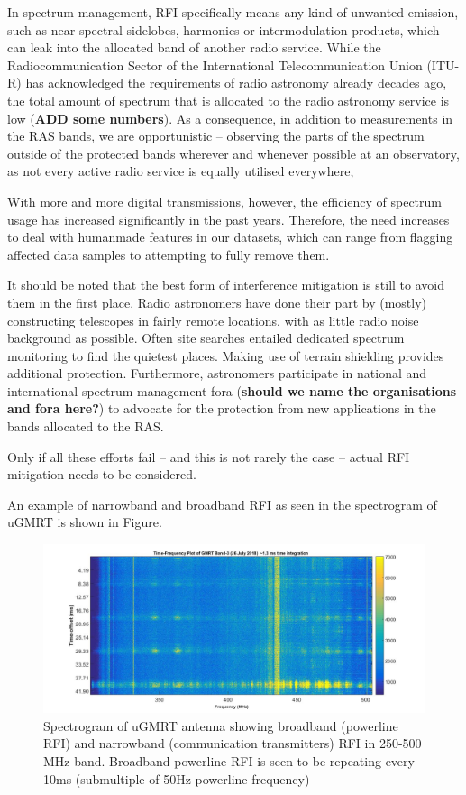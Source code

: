 In spectrum management, RFI specifically means any kind of unwanted emission, such as near spectral sidelobes, harmonics or intermodulation products, which can leak into the allocated band of another radio service. While the Radiocommunication Sector of the International Telecommunication Union (ITU-R) has acknowledged the requirements of radio astronomy already decades ago, the total amount of spectrum that is allocated to the radio astronomy service is low (\textbf{ADD some numbers}). As a consequence, in addition to measurements in the RAS bands, we are opportunistic -- observing the parts of the spectrum outside of the protected bands wherever and whenever possible at an observatory, as not every active radio service is equally utilised everywhere, 

With more and more digital transmissions, however, the efficiency of spectrum usage has increased significantly in the past years. Therefore, the need increases to deal with humanmade features in our datasets, which can range from flagging affected data samples to attempting to fully remove them.

It should be noted that the best form of interference mitigation is still to avoid them in the first place. Radio astronomers have done their part by (mostly) constructing telescopes in fairly remote locations, with as little radio noise background as possible. Often site searches entailed dedicated spectrum monitoring to find the quietest places. Making use of terrain shielding provides additional protection. Furthermore, astronomers participate in national and international spectrum management fora (\textbf{should we name the organisations and fora here?}) to advocate for the protection from new applications in the bands allocated to the RAS.

Only if all these efforts fail -- and this is not rarely the case -- actual RFI mitigation needs to be considered.

An example of narrowband and broadband RFI as seen in the spectrogram of uGMRT is shown in Figure.

\begin{figure}
    \centering
    \includegraphics[scale=0.25]{Hardware Excision Techniques/figures/time_freq(1).jpg}
    \caption{Spectrogram of uGMRT \cite{gupta2017upgraded} antenna showing broadband (powerline RFI) and narrowband (communication transmitters) RFI in 250-500 MHz band. Broadband powerline RFI is seen to be repeating every 10ms (submultiple of 50Hz powerline frequency)}
    \label{fig:ugmrt-rfi}
\end{figure}



